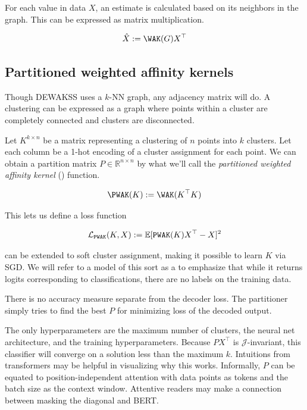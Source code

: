 For each value in data $X$, an estimate is calculated based on its neighbors in the graph. This can be expressed as matrix multiplication.

\begin{equation}
  \label{eq:WAK}
\hat{X} := \WAK(G)X^\top
\end{equation}


\subsection{Partitioned weighted affinity kernels} 
\label{app:pwak}

Though DEWAKSS uses a $k$-NN graph, any adjacency matrix will do.
A clustering can be expressed as a graph where points within a cluster are completely connected and clusters are disconnected.

Let $K^{k \times n}$ be a matrix representing a clustering of $n$ points into $k$ clusters. Let each column be a 1-hot encoding of a cluster assignment for each point. We can obtain a partition matrix $P \in \mathbb{R}^{n \times n}$ by what we'll call the \textit{partitioned weighted affinity kernel} (\PWAK) function.

\begin{equation}
  \label{eq:PWAK}
  \PWAK(K) := \WAK(K^\top K)
\end{equation}

This lets us define a loss function

\begin{equation}
  \mathcal{L}_{\mathop{\mathtt{PWAK}}\limits}(K,X) := \mathbb{E}[\mathop{\mathtt{PWAK}}\limits(K)X^\top - X]^2
\end{equation}


\PWAK can be extended to soft cluster assignment, making it possible to learn $K$ via SGD.
We will refer to a model of this sort as a \Partitioner to emphasize that while it returns logits corresponding to classifications, there are no labels on the training data.

There is no accuracy measure separate from the decoder loss.
The partitioner simply tries to find the best $P$ for minimizing loss of the decoded output.

The only hyperparameters are the maximum number of clusters, the neural net architecture, and the training hyperparameters.
Because $PX^\top$ is $\mathcal{J}$-invariant, this classifier will converge on a solution less than the maximum $k$.
Intuitions from transformers may be helpful in visualizing why this works.
Informally, $P$ can be equated to position-independent attention with data points as tokens and the batch size as the context window.
Attentive readers may make a connection between masking the diagonal and BERT.


